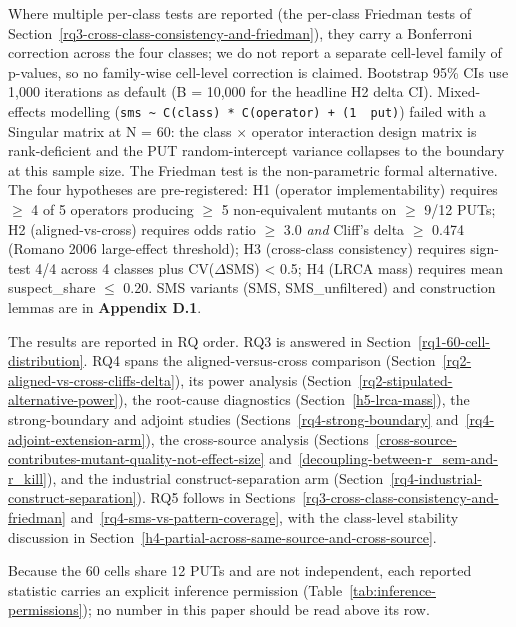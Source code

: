 \documentclass[manuscript,screen,review]{acmart}
\begin{document}
Where multiple per-class tests are reported (the per-class Friedman tests
of Section~\ref{rq3-cross-class-consistency-and-friedman}), they carry a Bonferroni correction across the four classes; we
do not report a separate cell-level family of p-values, so no family-wise
cell-level correction is claimed. Bootstrap 95\% CIs use 1,000 iterations
as default (B = 10,000 for the headline H2 delta CI). Mixed-effects
modelling
(\texttt{sms\ \textasciitilde{}\ C(class)\ *\ C(operator)\ +\ (1\ \textbar{}\ put)})
failed with a Singular matrix at N = 60: the class $\times$ operator
interaction design matrix is rank-deficient and the PUT random-intercept
variance collapses to the boundary at this sample size. The Friedman test
is the non-parametric formal alternative. The four hypotheses are
pre-registered: H1 (operator implementability) requires $\geq$ 4 of 5
operators producing $\geq$ 5 non-equivalent mutants on $\geq$ 9/12 PUTs; H2
(aligned-vs-cross) requires odds ratio $\geq$ 3.0 \emph{and} Cliff's delta $\geq$
0.474 (Romano 2006 large-effect threshold); H3 (cross-class consistency)
requires sign-test 4/4 across 4 classes plus CV($\Delta$SMS) \textless{} 0.5;
H4 (LRCA mass) requires mean suspect\_share $\leq$ 0.20. SMS variants
(SMS, SMS\_unfiltered) and construction lemmas are in
\textbf{Appendix D.1}.

The results are reported in RQ order. RQ3 is answered in
Section~\ref{rq1-60-cell-distribution}. RQ4 spans the aligned-versus-cross
comparison (Section~\ref{rq2-aligned-vs-cross-cliffs-delta}), its power
analysis (Section~\ref{rq2-stipulated-alternative-power}), the root-cause
diagnostics (Section~\ref{h5-lrca-mass}), the strong-boundary and adjoint
studies (Sections~\ref{rq4-strong-boundary} and~\ref{rq4-adjoint-extension-arm}),
the cross-source analysis
(Sections~\ref{cross-source-contributes-mutant-quality-not-effect-size}
and~\ref{decoupling-between-r_sem-and-r_kill}), and the industrial
construct-separation arm
(Section~\ref{rq4-industrial-construct-separation}). RQ5 follows in
Sections~\ref{rq3-cross-class-consistency-and-friedman}
and~\ref{rq4-sms-vs-pattern-coverage}, with the class-level stability
discussion in Section~\ref{h4-partial-across-same-source-and-cross-source}.

Because the 60 cells share 12 PUTs and are not independent, each
reported statistic carries an explicit inference permission
(Table~\ref{tab:inference-permissions}); no number in this paper should
be read above its row.
\end{document}
